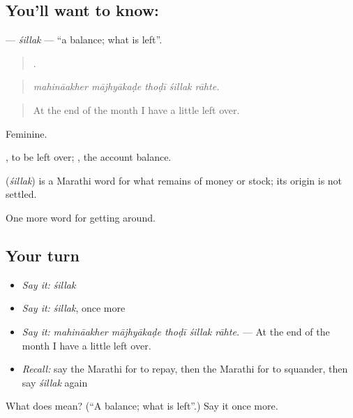 \subsection*{You'll want to know: }
\textbf{} — \emph{śillak} — \textquotedblleft{}a balance; what is left\textquotedblright{}.

\begin{quote}
    .
\end{quote}

\begin{quote}
\emph{mahināakher mājhyākaḍe thoḍī śillak rāhte.}
\end{quote}

\begin{quote}
At the end of the month I have a little left over.
\end{quote}

Feminine.

 , to be left over;  , the account balance.

\begin{cousinweb}
\textbf{} (\emph{śillak}) is a Marathi word for what remains of money or stock; its origin is not settled.
\end{cousinweb}

\begin{grammarlens}[title={What you've built}]
One more word for getting around.
\end{grammarlens}

\subsection*{Your turn}
\begin{itemize}
\raggedright
  \item \emph{Say it:} \emph{śillak}
  \item \emph{Say it:} \emph{śillak}, once more
  \item \emph{Say it:} \emph{mahināakher mājhyākaḍe thoḍī śillak rāhte.} — At the end of the month I have a little left over.
  \item \emph{Recall:} say the Marathi for to repay, then the Marathi for to squander, then say \emph{śillak} again
\end{itemize}

\begin{tcolorbox}[breakable,colback=teal!4,colframe=teal!35!black,title={Before you move on}]
What does  mean? (\textquotedblleft{}A balance; what is left\textquotedblright{}.) Say it once more.
\end{tcolorbox}
